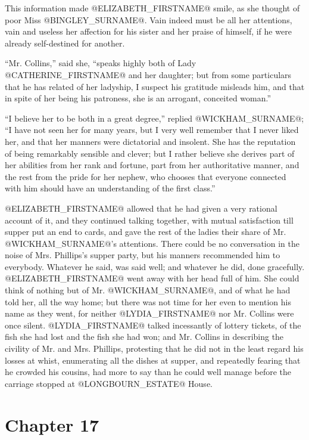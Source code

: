 This information made @ELIZABETH_FIRSTNAME@ smile, as she thought of poor Miss
@BINGLEY_SURNAME@. Vain indeed must be all her attentions, vain and useless her
affection for his sister and her praise of himself, if he were already
self-destined for another.

``Mr. Collins,'' said she, ``speaks highly both of Lady @CATHERINE_FIRSTNAME@ and her
daughter; but from some particulars that he has related of her ladyship,
I suspect his gratitude misleads him, and that in spite of her being his
patroness, she is an arrogant, conceited woman.''

``I believe her to be both in a great degree,'' replied @WICKHAM_SURNAME@; ``I have
not seen her for many years, but I very well remember that I never liked
her, and that her manners were dictatorial and insolent. She has the
reputation of being remarkably sensible and clever; but I rather believe
she derives part of her abilities from her rank and fortune, part from
her authoritative manner, and the rest from the pride for her
nephew, who chooses that everyone connected with him should have an
understanding of the first class.''

@ELIZABETH_FIRSTNAME@ allowed that he had given a very rational account of it, and
they continued talking together, with mutual satisfaction till supper
put an end to cards, and gave the rest of the ladies their share of Mr.
@WICKHAM_SURNAME@'s attentions. There could be no conversation in the noise
of Mrs. Phillips's supper party, but his manners recommended him to
everybody. Whatever he said, was said well; and whatever he did, done
gracefully. @ELIZABETH_FIRSTNAME@ went away with her head full of him. She could
think of nothing but of Mr. @WICKHAM_SURNAME@, and of what he had told her, all
the way home; but there was not time for her even to mention his name
as they went, for neither @LYDIA_FIRSTNAME@ nor Mr. Collins were once silent. @LYDIA_FIRSTNAME@
talked incessantly of lottery tickets, of the fish she had lost and the
fish she had won; and Mr. Collins in describing the civility of Mr. and
Mrs. Phillips, protesting that he did not in the least regard his losses
at whist, enumerating all the dishes at supper, and repeatedly fearing
that he crowded his cousins, had more to say than he could well manage
before the carriage stopped at @LONGBOURN_ESTATE@ House.



\chapter*{Chapter 17}


